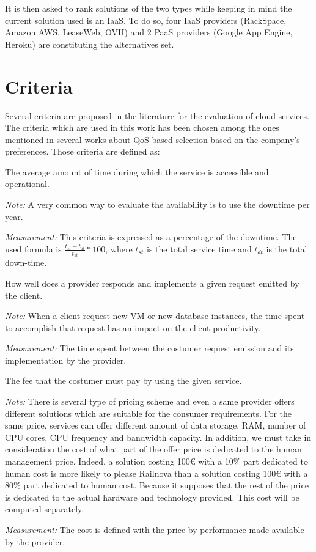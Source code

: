 \documentclass[a4paper,11pt]{article}
\begin{document}
It is then asked to rank solutions of the two types while keeping in mind the current solution used is an IaaS. To do so, four IaaS providers (RackSpace, Amazon AWS, LeaseWeb, OVH) and 2 PaaS providers (Google App Engine, Heroku) are constituting the alternatives set.

\section{Criteria}
Several criteria are proposed in the literature for the evaluation of cloud services. The criteria which are used in this work has been chosen among the ones mentioned in several works about QoS based selection based on the company's preferences.
Those criteria are defined as:
\begin{description}[parsep=10pt,listparindent=\parindent,labelindent=\parindent,font=$\bullet$\ ]
  \item[Availability:] The average amount of time during which the service is accessible and operational.
    \par \emph{Note:} A very common way to evaluate the availability is to use the downtime per year.
    \par \emph{Measurement:} This criteria is expressed as a percentage of the downtime. The used formula is $\frac{t_{st}-t_{dt}}{t_{st}}*100$, where $t_{st}$ is the total service time and $t_{dt}$ is the total down-time.

  \item[Service efficiency:] How well does a provider responds and implements a given request emitted by the client.
     \par \emph{Note:} When a client request new VM or new database instances, the time spent to accomplish that request has an impact on the client productivity.
    \par \emph{Measurement:} The time spent between the costumer request emission and its implementation by the provider.

  \item[Cost:] The fee that the costumer must pay by using the given service.
    \par \emph{Note:} There is several type of pricing scheme and even a same provider offers different solutions which are suitable for the consumer requirements. For the same price, services can offer different amount of data storage, RAM, number of CPU cores, CPU frequency and bandwidth capacity. In addition, we must take in consideration the cost of what part of the offer price is dedicated to the human management price. Indeed, a solution costing 100\euro{} with a 10\% part dedicated to human cost is more likely to please Railnova than a solution costing 100\euro{} with a 80\% part dedicated to human cost. Because it supposes that the rest of the price is dedicated to the actual hardware and technology provided. This cost will be computed separately.
    \par \emph{Measurement:} The cost is defined with the price by performance made available by the provider.


\end{description}
\end{document}
